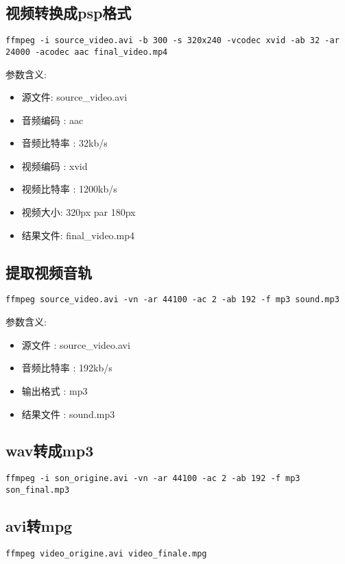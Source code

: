 \documentclass[adobefonts]{ctexart}
\begin{document}
\subsection{视频转换成psp格式}
\begin{verbatim}
ffmpeg -i source_video.avi -b 300 -s 320x240 -vcodec xvid -ab 32 -ar 24000 -acodec aac final_video.mp4
\end{verbatim}
参数含义:
\begin{itemize}
\item 源文件: source\_video.avi
\item 音频编码 : aac
\item 音频比特率 : 32kb/s
\item 视频编码 : xvid
\item 视频比特率 : 1200kb/s
\item 视频大小: 320px par 180px
\item 结果文件: final\_video.mp4
\end{itemize}

\subsection{提取视频音轨}
\begin{verbatim}
ffmpeg source_video.avi -vn -ar 44100 -ac 2 -ab 192 -f mp3 sound.mp3
\end{verbatim}
参数含义:
\begin{itemize}
\item 源文件 : source\_video.avi
\item 音频比特率 : 192kb/s
\item 输出格式 : mp3
\item 结果文件 : sound.mp3
\end{itemize}

\subsection{wav转成mp3}
\begin{verbatim}
ffmpeg -i son_origine.avi -vn -ar 44100 -ac 2 -ab 192 -f mp3 son_final.mp3
\end{verbatim}

\subsection{avi转mpg}
\begin{verbatim}
ffmpeg video_origine.avi video_finale.mpg
\end{verbatim}
\end{document}
